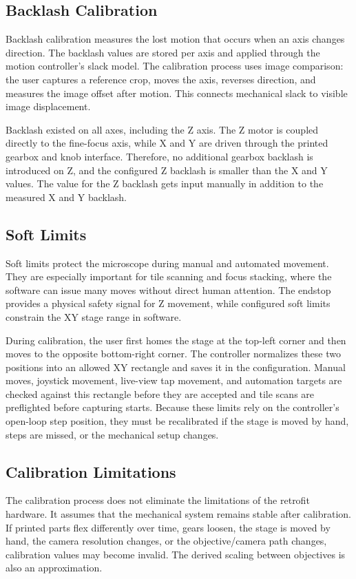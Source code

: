 \subsection{Backlash Calibration}

Backlash calibration measures the lost motion that occurs when an axis changes direction. The backlash values are stored per axis and applied through the motion controller's slack model. The calibration process uses image comparison: the user captures a reference crop, moves the axis, reverses direction, and measures the image offset after motion. This connects mechanical slack to visible image displacement.

Backlash existed on all axes, including the Z axis. The Z motor is coupled directly to the fine-focus axis, while X and Y are driven through the printed gearbox and knob interface. Therefore, no additional gearbox backlash is introduced on Z, and the configured Z backlash is smaller than the X and Y values. The value for the Z backlash gets input manually in addition to the measured X and Y backlash.

\subsection{Soft Limits}

Soft limits protect the microscope during manual and automated movement. They are especially important for tile scanning and focus stacking, where the software can issue many moves without direct human attention. The endstop provides a physical safety signal for Z movement, while configured soft limits constrain the XY stage range in software.

During calibration, the user first homes the stage at the top-left corner and then moves to the opposite bottom-right corner. The controller normalizes these two positions into an allowed XY rectangle and saves it in the configuration. Manual moves, joystick movement, live-view tap movement, and automation targets are checked against this rectangle before they are accepted and tile scans are preflighted before capturing starts. Because these limits rely on the controller's open-loop step position, they must be recalibrated if the stage is moved by hand, steps are missed, or the mechanical setup changes.

\subsection{Calibration Limitations}

The calibration process does not eliminate the limitations of the retrofit hardware. It assumes that the mechanical system remains stable after calibration. If printed parts flex differently over time, gears loosen, the stage is moved by hand, the camera resolution changes, or the objective/camera path changes, calibration values may become invalid. The derived scaling between objectives is also an approximation.
